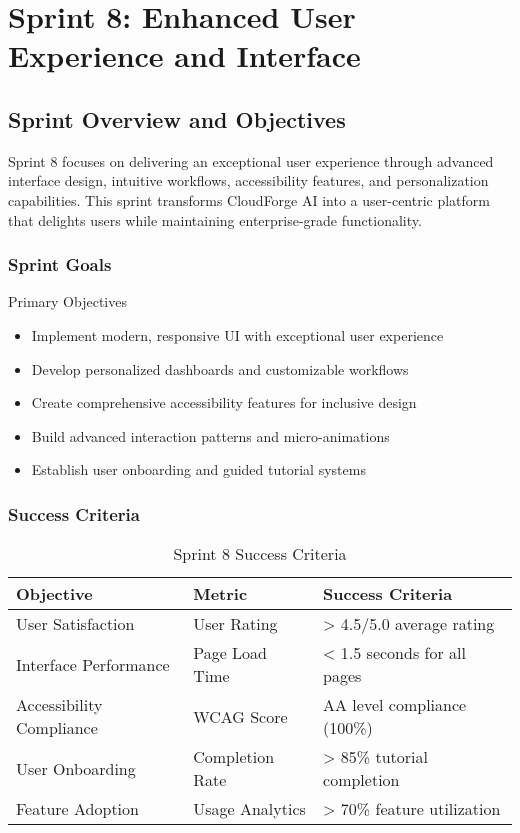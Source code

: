 \chapter{Sprint 8: Enhanced User Experience and Interface}

\section{Sprint Overview and Objectives}

Sprint 8 focuses on delivering an exceptional user experience through advanced interface design, intuitive workflows, accessibility features, and personalization capabilities. This sprint transforms CloudForge AI into a user-centric platform that delights users while maintaining enterprise-grade functionality.

\subsection{Sprint Goals}

\begin{sprintbox}{Primary Objectives}
\begin{itemize}
    \item Implement modern, responsive UI with exceptional user experience
    \item Develop personalized dashboards and customizable workflows
    \item Create comprehensive accessibility features for inclusive design
    \item Build advanced interaction patterns and micro-animations
    \item Establish user onboarding and guided tutorial systems
\end{itemize}
\end{sprintbox}

\subsection{Success Criteria}

\begin{table}[H]
\centering
\caption{Sprint 8 Success Criteria}
\begin{tabular}{|p{4cm}|p{3cm}|p{5cm}|}
\hline
\textbf{Objective} & \textbf{Metric} & \textbf{Success Criteria} \\
\hline
User Satisfaction & User Rating & > 4.5/5.0 average rating \\
\hline
Interface Performance & Page Load Time & < 1.5 seconds for all pages \\
\hline
Accessibility Compliance & WCAG Score & AA level compliance (100\%) \\
\hline
User Onboarding & Completion Rate & > 85\% tutorial completion \\
\hline
Feature Adoption & Usage Analytics & > 70\% feature utilization \\
\hline
\end{tabular}
\end{table}

